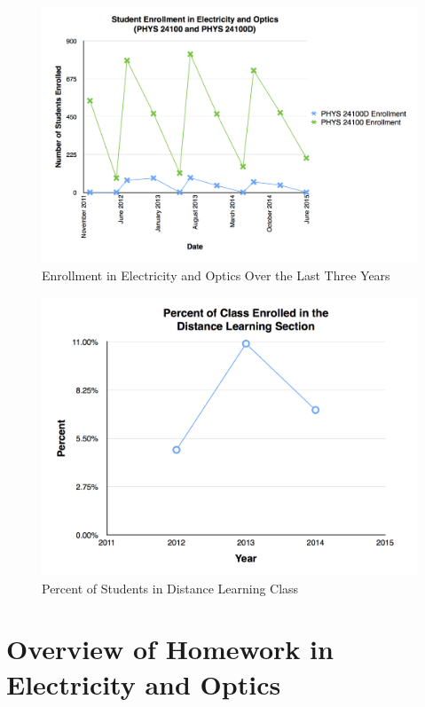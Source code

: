 \begin{figure}[!hb]
	\centering
	\includegraphics[width=5in]{img/chapter1/enrollment}
	\caption[Enrollment in Electricity and Optics Over the Last Three Years]{Enrollment in Electricity and Optics Over the Last Three Years}
	\label{fig:enrollment}
\end{figure}

\begin{figure}[!hb]
	\centering
	\includegraphics[width=5in]{img/chapter1/percent}
	\caption[Percent of Students in Distance Learning Class]{Percent of Students in Distance Learning Class}
	\label{fig:percent}
\end{figure}

\section{Overview of Homework in Electricity and Optics}

